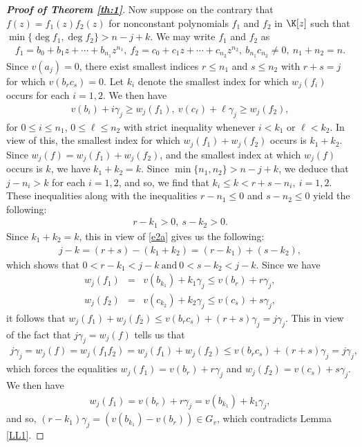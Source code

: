 \documentclass[12pt]{amsart}%
\begin{document}
\begin{proof}[\bf Proof of Theorem \ref{th:1}]
Now suppose on the contrary that $f(z)=f_1(z)f_2(z)$ for nonconstant polynomials $f_1$ and $f_2$ in $\K[z]$ such that $\min\{\deg f_1,\deg f_2\}>n-j+k$. We may write $f_1$ and $f_2$ as
\begin{eqnarray*}
f_1=b_0+b_1z+\cdots+b_{n_1}z^{n_1},~f_2=c_0+c_1z+\cdots+c_{n_2} z^{n_2},~b_{n_1}c_{n_2}\neq 0,~n_1+n_2=n.
\end{eqnarray*}
Since $v(a_j)=0$, there exist smallest indices $r\leq n_1$ and $s\leq n_2$ with $r+s=j$ for which $v(b_rc_s)=0$.
Let $k_i$ denote the smallest index for which $w_j(f_i)$ occurs for each $i=1,2$. We then have
\begin{eqnarray*}
	v(b_i)+i\gamma_j\geq w_j(f_1),~v(c_\ell)+\ell\gamma_j\geq w_j(f_2),
\end{eqnarray*}
for $0\leq i \leq n_1$, $0\leq \ell\leq n_2$ with strict inequality whenever $i<k_1$ or $\ell<k_2$. In view of this, the smallest index for which $w_j(f_1)+w_j(f_2)$ occurs is $k_1+k_2$. Since $w_j(f)=w_j(f_1)+w_j(f_2)$, and the smallest index at which $w_j(f)$ occurs is $k$, we have $k_1+k_2=k$. Since $\min\{n_1,n_2\}>n-j+k$, we deduce that $j-n_i>k$ for each $i=1,2$, and so, we find that
	$k_i\leq k<r+s-n_i,~i=1,2$. These inequalities along with the inequalities $r-n_1\leq 0$ and $s-n_2\leq 0$ yield the following:
\begin{eqnarray}\label{e2a}
	r-k_1>0,~s-k_2>0.
\end{eqnarray}
Since $k_1+k_2=k$, this in view of \eqref{e2a} gives us the following:
\begin{eqnarray*}
    j-k=(r+s)-(k_1+k_2)=(r-k_1)+(s-k_2),
\end{eqnarray*}
which shows that
$0<r-k_1<j-k~\text{and}~0<s-k_2<j-k$.
Since we have
\begin{eqnarray*}
w_j(f_1)&=&v(b_{k_1})+k_1\gamma_j\leq v(b_r)+r \gamma_j,\\
w_j(f_2)&=&v(c_{k_2})+k_2\gamma_j\leq v(c_{s})+s\gamma_j,
\end{eqnarray*}
it follows that $w_j(f_1)+w_j(f_2)\leq v(b_rc_s)+(r+s)\gamma_j=j\gamma_j$. This in view of the fact that $j\gamma_j=w_j(f)$ tells us that
\begin{eqnarray*}
	j\gamma_j=w_j(f)=w_j(f_1f_2)=w_j(f_1)+w_j(f_2)\leq v(b_rc_s)+(r+s)\gamma_j=j\gamma_j,
\end{eqnarray*}
which forces the equalities $w_j(f_1)=v(b_r)+r\gamma_j$ and $w_j(f_2)=v(c_s)+s\gamma_j$. We then have
\begin{eqnarray*}
w_j(f_1)=v(b_r)+r\gamma_j=v(b_{k_1})+k_1\gamma_j,
\end{eqnarray*}
and so, $(r-k_1)\gamma_j =(v(b_{k_1})-v(b_r))\in G_v$, which contradicts Lemma \ref{LL1}.
\end{proof}
\end{document}
